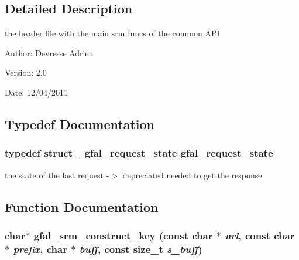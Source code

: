 \subsection{Detailed Description}
the header file with the main srm funcs of the common API 

\begin{Desc}
\item[Author:]Devresse Adrien \end{Desc}
\begin{Desc}
\item[Version:]2.0 \end{Desc}
\begin{Desc}
\item[Date:]12/04/2011 \end{Desc}


\subsection{Typedef Documentation}
\subsubsection{\setlength{\rightskip}{0pt plus 5cm}typedef struct \bf{\_\-gfal\_\-request\_\-state}  \bf{gfal\_\-request\_\-state}}\label{gfal__common__srm_8h_c22ba8f2cb763532758e405bc3e51ed3}


the state of the last request -$>$ depreciated needed to get the response 

\subsection{Function Documentation}
\subsubsection{\setlength{\rightskip}{0pt plus 5cm}char$\ast$ gfal\_\-srm\_\-construct\_\-key (const char $\ast$ {\em url}, const char $\ast$ {\em prefix}, char $\ast$ {\em buff}, const size\_\-t {\em s\_\-buff})\hspace{0.3cm}{\tt  [inline]}}\label{gfal__common__srm_8h_583148369d56c8899aedf505a4bd2c5b}



